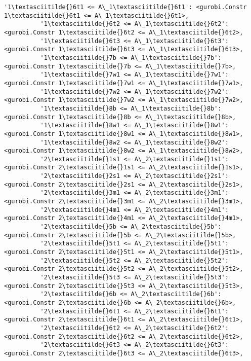\documentclass[11pt]{article}
\begin{document}
\begin{Verbatim}[commandchars=\\\{\}]
          '1\textasciitilde{}6t1 <= A\_1\textasciitilde{}6t1': <gurobi.Constr 1\textasciitilde{}6t1 <= A\_1\textasciitilde{}6t1>,
          '1\textasciitilde{}6t2 <= A\_1\textasciitilde{}6t2': <gurobi.Constr 1\textasciitilde{}6t2 <= A\_1\textasciitilde{}6t2>,
          '1\textasciitilde{}6t3 <= A\_1\textasciitilde{}6t3': <gurobi.Constr 1\textasciitilde{}6t3 <= A\_1\textasciitilde{}6t3>,
          '1\textasciitilde{}7b <= A\_1\textasciitilde{}7b': <gurobi.Constr 1\textasciitilde{}7b <= A\_1\textasciitilde{}7b>,
          '1\textasciitilde{}7w1 <= A\_1\textasciitilde{}7w1': <gurobi.Constr 1\textasciitilde{}7w1 <= A\_1\textasciitilde{}7w1>,
          '1\textasciitilde{}7w2 <= A\_1\textasciitilde{}7w2': <gurobi.Constr 1\textasciitilde{}7w2 <= A\_1\textasciitilde{}7w2>,
          '1\textasciitilde{}8b <= A\_1\textasciitilde{}8b': <gurobi.Constr 1\textasciitilde{}8b <= A\_1\textasciitilde{}8b>,
          '1\textasciitilde{}8w1 <= A\_1\textasciitilde{}8w1': <gurobi.Constr 1\textasciitilde{}8w1 <= A\_1\textasciitilde{}8w1>,
          '1\textasciitilde{}8w2 <= A\_1\textasciitilde{}8w2': <gurobi.Constr 1\textasciitilde{}8w2 <= A\_1\textasciitilde{}8w2>,
          '2\textasciitilde{}1s1 <= A\_2\textasciitilde{}1s1': <gurobi.Constr 2\textasciitilde{}1s1 <= A\_2\textasciitilde{}1s1>,
          '2\textasciitilde{}2s1 <= A\_2\textasciitilde{}2s1': <gurobi.Constr 2\textasciitilde{}2s1 <= A\_2\textasciitilde{}2s1>,
          '2\textasciitilde{}3m1 <= A\_2\textasciitilde{}3m1': <gurobi.Constr 2\textasciitilde{}3m1 <= A\_2\textasciitilde{}3m1>,
          '2\textasciitilde{}4m1 <= A\_2\textasciitilde{}4m1': <gurobi.Constr 2\textasciitilde{}4m1 <= A\_2\textasciitilde{}4m1>,
          '2\textasciitilde{}5b <= A\_2\textasciitilde{}5b': <gurobi.Constr 2\textasciitilde{}5b <= A\_2\textasciitilde{}5b>,
          '2\textasciitilde{}5t1 <= A\_2\textasciitilde{}5t1': <gurobi.Constr 2\textasciitilde{}5t1 <= A\_2\textasciitilde{}5t1>,
          '2\textasciitilde{}5t2 <= A\_2\textasciitilde{}5t2': <gurobi.Constr 2\textasciitilde{}5t2 <= A\_2\textasciitilde{}5t2>,
          '2\textasciitilde{}5t3 <= A\_2\textasciitilde{}5t3': <gurobi.Constr 2\textasciitilde{}5t3 <= A\_2\textasciitilde{}5t3>,
          '2\textasciitilde{}6b <= A\_2\textasciitilde{}6b': <gurobi.Constr 2\textasciitilde{}6b <= A\_2\textasciitilde{}6b>,
          '2\textasciitilde{}6t1 <= A\_2\textasciitilde{}6t1': <gurobi.Constr 2\textasciitilde{}6t1 <= A\_2\textasciitilde{}6t1>,
          '2\textasciitilde{}6t2 <= A\_2\textasciitilde{}6t2': <gurobi.Constr 2\textasciitilde{}6t2 <= A\_2\textasciitilde{}6t2>,
          '2\textasciitilde{}6t3 <= A\_2\textasciitilde{}6t3': <gurobi.Constr 2\textasciitilde{}6t3 <= A\_2\textasciitilde{}6t3>,

\end{Verbatim}
\end{document}
